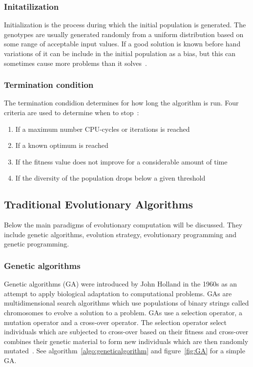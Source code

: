 \subsubsection{Initatilization}

Initialization is the process during which the initial population is generated. The genotypes are usually generated randomly from a uniform distribution based on some range of acceptable input values. If a good solution is known before hand variations of it can be include in the initial population as a bias, but this can sometimes cause more problems than it solves~\cite{Eiben20021}.

\subsubsection{Termination condition}

The termination condidion determines for how long the algorithm is run. Four criteria are used to determine when to stop~\cite{Eiben2015_whatevolutionary}:

\begin{enumerate}
  \item If a maximum number CPU-cycles or iterations is reached
  \item If a known optimum is reached
  \item If the fitness value does not improve for a considerable amount of time
  \item If the diversity of the population drops below a given threshold
\end{enumerate}

\subsection{Traditional Evolutionary Algorithms}

Below the main paradigms of evolutionary computation will be discussed. They include genetic algorithms, evolution strategy, evolutionary programming and genetic programming.

\subsubsection{Genetic algorithms}

Genetic algorithms (GA) were introduced by John Holland in the 1960s as an attempt to apply biological adaptation to computational problems. GAs are multidimensional search algorithms which use populations of binary strings called chromosomes to evolve a solution to a problem. GAs use a selection operator, a mutation operator and a cross-over operator. The selection operator select individuals which are subjected to cross-over based on their fitness and cross-over combines their genetic material to form new individuals which are then randomly mutated~\cite{mitchel1999evolutionary}. See algorithm~\ref{algo:geneticalgorithm} and figure~\ref{fig:GA} for a simple GA.

